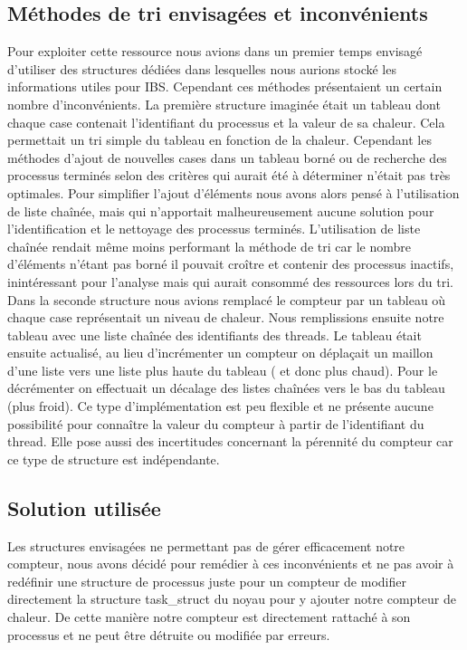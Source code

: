     \subsection{Méthodes de tri envisagées et inconvénients}

      Pour exploiter cette ressource nous avions dans un premier temps envisagé
      d'utiliser des structures dédiées dans lesquelles nous aurions stocké les
      informations utiles pour IBS. Cependant ces méthodes présentaient un
      certain nombre d'inconvénients.  La première structure imaginée était un
      tableau dont chaque case contenait l'identifiant du processus et la valeur
      de sa chaleur. Cela permettait un tri simple du tableau en fonction de la
      chaleur. Cependant les méthodes d'ajout de nouvelles cases dans un tableau
      borné ou de recherche des processus terminés selon des critères qui aurait
      été à déterminer n'était pas très optimales.  Pour simplifier l'ajout
      d'éléments nous avons alors pensé à l'utilisation de liste chaînée, mais
      qui n'apportait malheureusement aucune solution pour l'identification et
      le nettoyage des processus terminés. L'utilisation de liste chaînée
      rendait même moins performant la méthode de tri car le nombre d'éléments
      n'étant pas borné il pouvait croître et contenir des processus inactifs,
      inintéressant pour l'analyse mais qui aurait consommé des ressources lors
      du tri. Dans la seconde structure nous avions remplacé le compteur par un
      tableau où chaque case représentait un niveau de chaleur. Nous
      remplissions ensuite notre tableau avec une liste chaînée des identifiants
      des threads. Le tableau était ensuite actualisé, au lieu d'incrémenter un
      compteur on déplaçait un maillon d'une liste vers une liste plus haute du
      tableau ( et donc plus chaud). Pour le décrémenter on effectuait un
      décalage des listes chaînées vers le bas du tableau (plus froid). Ce type
      d'implémentation est peu flexible et ne présente aucune possibilité pour
      connaître la valeur du compteur à partir de l'identifiant du thread. Elle
      pose aussi des incertitudes concernant la pérennité du compteur car ce
      type de structure est indépendante.

    \subsection{Solution utilisée}

      Les structures envisagées ne permettant pas de gérer efficacement notre
      compteur, nous avons décidé pour remédier à ces inconvénients et ne pas
      avoir à redéfinir une structure de processus juste pour un compteur de
      modifier directement la structure task\_struct du noyau pour y ajouter
      notre compteur de chaleur. De cette manière notre compteur est directement
      rattaché à son processus et ne peut être détruite ou modifiée par erreurs.


